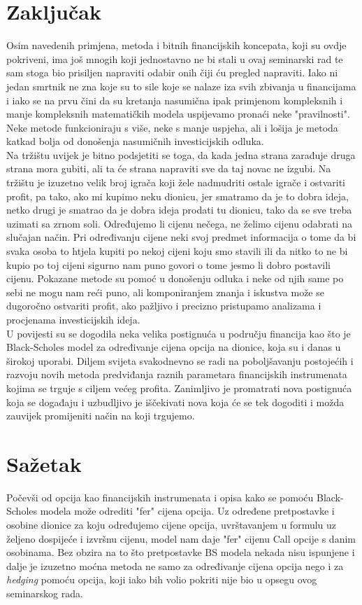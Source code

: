 \documentclass[times, utf8, seminar]{fer}
\begin{document}
\chapter{Zaključak}
Osim navedenih primjena, metoda i bitnih financijskih koncepata, koji su ovdje pokriveni, ima još mnogih koji jednostavno ne bi stali u ovaj seminarski rad te sam stoga bio prisiljen napraviti odabir onih čiji ću pregled napraviti. Iako ni jedan smrtnik ne zna koje su to sile koje se nalaze iza svih zbivanja u financijama i iako se na prvu čini da su kretanja nasumična ipak primjenom kompleksnih i manje kompleksnih matematičkih modela uspijevamo pronaći neke "pravilnosti". Neke metode funkcioniraju s više, neke s manje uspjeha, ali i lošija je metoda katkad bolja od donošenja nasumičnih investicijskih odluka.\\
Na tržištu uvijek je bitno podsjetiti se toga, da kada jedna strana zarađuje druga strana mora gubiti, ali ta će strana napraviti sve da taj novac ne izgubi. Na tržištu je izuzetno velik broj igrača koji žele nadmudriti ostale igrače i ostvariti profit, pa tako, ako mi kupimo neku dionicu, jer smatramo da je to dobra ideja, netko drugi je smatrao da je dobra ideja prodati tu dionicu, tako da se sve treba uzimati sa zrnom soli. Određujemo li cijenu nečega, ne želimo cijenu odabrati na slučajan način. Pri određivanju cijene neki svoj predmet informacija o tome da bi svaka osoba to htjela kupiti po nekoj cijeni koju smo stavili ili da nitko to ne bi kupio po toj cijeni sigurno nam puno govori o tome jesmo li dobro postavili cijenu. Pokazane metode su pomoć u donošenju odluka i neke od njih same po sebi ne mogu nam reći puno, ali komponiranjem znanja i iskustva može se dugoročno ostvariti profit, ako pažljivo i precizno pristupamo analizama i procjenama investicijskih ideja. \\
U povijesti su se dogodila neka velika postignuća u području financija kao što je Black-Scholes model za određivanje cijena opcija na dionice, koja su i danas u širokoj uporabi. Diljem svijeta svakodnevno se radi na poboljšavanju postojećih i razvoju novih metoda predviđanja raznih parametara financijskih instrumenata kojima se trguje s ciljem većeg profita. Zanimljivo je promatrati nova postignuća koja se događaju i uzbudljivo je iščekivati nova koja će se tek dogoditi i možda zauvijek promijeniti način na koji trgujemo.




\chapter{Sažetak}
Počevši od opcija kao financijskih instrumenata i opisa kako se pomoću Black-Scholes modela može odrediti "fer" cijena opcija. Uz određene pretpostavke i osobine dionice za koju određujemo cijene opcija, uvrštavanjem u formulu uz željeno dospijeće i izvršnu cijenu, model nam daje "fer" cijenu Call opcije s danim osobinama. Bez obzira na to što pretpostavke BS modela nekada nisu ispunjene i dalje je izuzetno moćna metoda ne samo za određivanje cijena opcija nego i za \textit{hedging} pomoću opcija, koji iako bih volio pokriti nije bio u opsegu ovog seminarskog rada.
\end{document}
